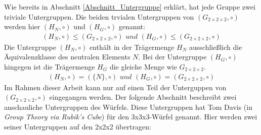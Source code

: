 \documentclass[12pt,a4paper, usenames, dvipsnames]{article}
\theoremstyle{mystyle}
\theoremstyle{definition}
\newcommand{\Gtwo}{\ensuremath{G_{2\times 2\times 2}}}
\begin{document}
Wie bereits in Abschnitt \ref{Abschnitt_Untergruppe} erklärt, hat jede Gruppe zwei triviale Untergruppen. Die beiden trvialen Untergruppen von $(\Gtwo, \circ)$ werden hier $(H_N, \circ)$ und $(H_G, \circ)$ genannt: 
\begin{align*}
(H_N, \circ) \leqslant (\Gtwo, \circ)\textit{ und }(H_G, \circ) \leqslant (\Gtwo, \circ)
\end{align*} 
Die Untergruppe $(H_N, \circ)$ enthält in der Trägermenge $H_N$ ausschließlich die Äquivalenzklasse des neutralen Elements $N$. Bei der Untergruppe $(H_G, \circ)$ hingegen ist die Trägermenge $H_G$ die gleiche Menge wie $\Gtwo$. 
\begin{align*}
(H_N, \circ) = (\{N\}, \circ)\textit{ und }  (H_G, \circ) = (\Gtwo, \circ)
\end{align*}
Im Rahmen dieser Arbeit kann nur auf einen Teil der Unterguppen von $(\Gtwo, \circ)$ eingegangen werden. 
Der folgende Abschnitt beschreibt zwei anschauliche Untergruppen des Würfels. Diese Untergruppen hat Tom Davis (in  \textit{Group Theory via Rubik's Cube}) \cite{TD} für den 3x3x3-Würfel genannt. Hier werden zwei seiner Untergruppen auf den 2x2x2 übertragen: 
\end{document}
